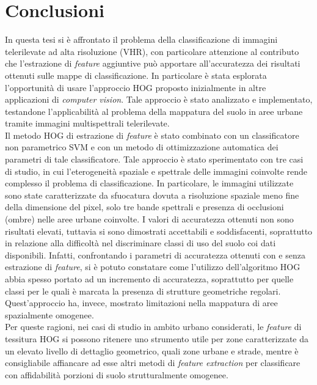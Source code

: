 

\chapter{Conclusioni}
\label{cap:conclusioni}

In questa tesi si è affrontato il problema della classificazione di immagini telerilevate ad alta risoluzione (VHR), con particolare attenzione al contributo che l'estrazione di \emph{feature} aggiuntive può apportare all'accuratezza dei risultati ottenuti sulle mappe di classificazione.
In particolare è stata esplorata l'opportunità di usare l'approccio HOG proposto inizialmente in altre applicazioni di \emph{computer vision}. Tale approccio è stato analizzato e implementato, testandone l'applicabilità al problema della mappatura del suolo in aree urbane tramite immagini multispettrali telerilevate.\\
Il metodo HOG di estrazione di \emph{feature} è stato combinato con un classificatore non parametrico SVM e con un metodo di ottimizzazione automatica dei parametri di tale classificatore. Tale approccio è stato sperimentato con tre casi di studio, in cui l'eterogeneità spaziale e spettrale delle immagini coinvolte rende complesso il problema di classificazione. In particolare, le immagini utilizzate sono state caratterizzate da sfuocatura dovuta a risoluzione spaziale meno fine della dimensione del pixel, solo tre bande spettrali e presenza di occlusioni (ombre) nelle aree urbane coinvolte.
I valori di accuratezza ottenuti non sono risultati elevati, tuttavia si sono dimostrati accettabili e soddisfacenti, soprattutto in relazione alla difficoltà nel discriminare classi di uso del suolo coi dati disponibili.
Infatti, confrontando i parametri di accuratezza ottenuti con e senza estrazione di \emph{feature}, si è potuto constatare come l'utilizzo dell'algoritmo HOG abbia spesso portato ad un incremento di accuratezza, soprattutto per quelle classi per le quali è marcata la presenza di strutture geometriche regolari. 
Quest'approccio ha, invece, mostrato limitazioni nella mappatura di aree spazialmente omogenee.\\
Per queste ragioni, nei casi di studio in ambito urbano considerati, le \emph{feature} di tessitura HOG si possono ritenere uno strumento utile per zone caratterizzate da un elevato livello di dettaglio geometrico, quali zone urbane e strade, mentre è consigliabile affiancare ad esse altri metodi di \emph{feature extraction} per classificare con affidabilità porzioni di suolo strutturalmente omogenee.\\
